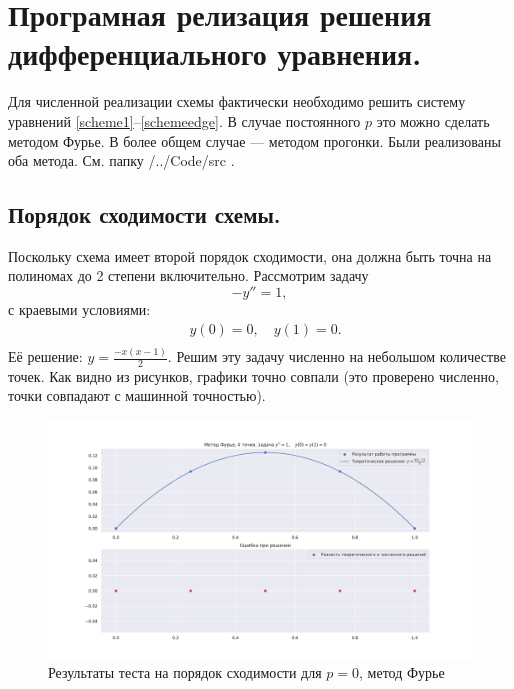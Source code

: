\documentclass[14pt,a4paper]{extarticle}
\newcommand{\1}{\mathbbm{1}}
\begin{document}
\section{Програмная релизация решения дифференциального уравнения.}
Для численной реализации схемы фактически необходимо решить систему уравнений \eqref{scheme1}--\eqref{schemeedge}. 
В случае постоянного $p$ это можно сделать методом Фурье. В более общем случае --- методом прогонки. Были реализованы оба метода. См. папку /../Code/src .
\subsection{Порядок сходимости схемы.}
Поскольку схема имеет второй порядок сходимости, она должна быть точна на полиномах до 2 степени включительно. Рассмотрим задачу
\begin{equation*} \label{diffeq1}
    -y'' = 1,
\end{equation*}
с краевыми условиями:
\begin{align*} \label{diffeqedge}
    & y(0) = 0, \quad y(1) = 0. \\
\end{align*}
Её решение: $y = \frac{-x(x-1)}{2}$. Решим эту задачу численно на небольшом количестве точек. Как видно из рисунков, графики точно совпали 
(это проверено численно, точки совпадают с машинной точностью).
\begin{figure}
    \centering
    \includegraphics[scale=0.4]{figs/f4p0f1.pdf}
    \caption{Результаты теста на порядок сходимости для $p=0$, метод Фурье}
\end{figure}
\end{document}
